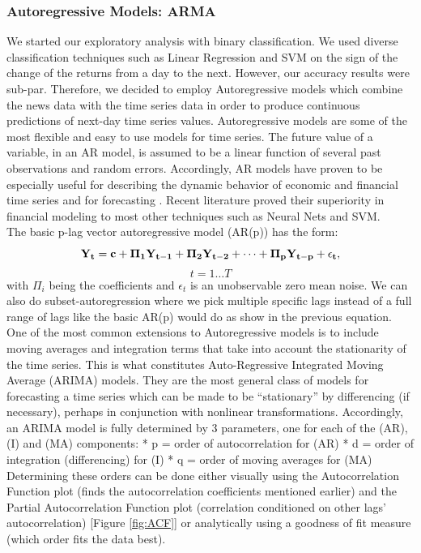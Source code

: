 \subsubsection{Autoregressive Models: ARMA}
We started our exploratory analysis with binary classification. We used diverse classification techniques such as Linear Regression and SVM on the sign of the change of the returns from a day to the next. However, our accuracy results were sub-par. Therefore, we decided to employ Autoregressive models which combine the news data with the time series data in order to produce continuous predictions of next-day time series values. %
Autoregressive models are some of the most flexible and easy to use models for time series. The future value of a variable, in an AR model, is assumed to be a linear function of several past observations and random errors. Accordingly, AR models have proven to be especially useful for describing the dynamic behavior of economic and financial time series and for forecasting \cite{tsay, VAR}. Recent literature proved their superiority in financial modeling to most other techniques such as Neural Nets and SVM. %
\\
The basic p-lag vector autoregressive model (AR(p)) has the form: $$\bf{Y}_t=\bf{c}+\bf{\Pi}_1\bf{Y}_{t-1}+\bf{\Pi}_2\bf{Y}_{t-2}+\cdots+\bf{\Pi}_p\bf{Y}_{t-p}+\epsilon_t,$$ $$t=1\ldots T$$ with $\Pi_i$ being the coefficients and $\epsilon_t$ is an unobservable zero mean noise. We can also do subset-autoregression where we pick multiple specific lags instead of a full range of lags like the basic AR(p) would do as show in the previous equation.
One of the most common extensions to Autoregressive models is to include moving averages and integration terms that take into account the stationarity of the time series. This is what constitutes Auto-Regressive Integrated Moving Average (ARIMA) models. They are  the most general class of models for forecasting a time series which can be made to be “stationary” by differencing (if necessary), perhaps in conjunction with nonlinear transformations.
Accordingly, an ARIMA model is fully determined by 3 parameters, one for each of the (AR),(I) and (MA) components: %
* p = order of autocorrelation for (AR)
* d = order of integration (differencing) for (I)
* q = order of moving averages for (MA)
Determining these orders can be done either visually using the Autocorrelation Function plot (finds the autocorrelation coefficients mentioned earlier) and the Partial Autocorrelation Function plot (correlation conditioned on other lags' autocorrelation) [Figure \ref{fig:ACF}] or analytically using a goodness of fit measure (which order fits the data best).
